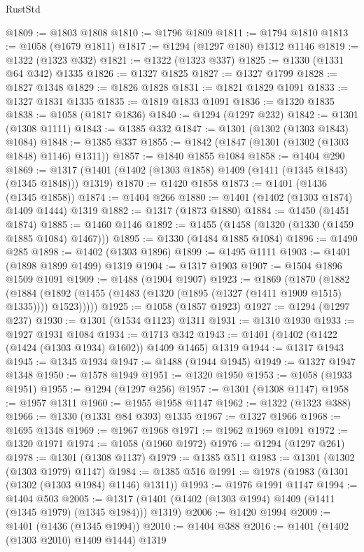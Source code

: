 \begin{lexlean}{RustStd}
\begin{coremodule}
@1809 := @1803 @1808
@1810 := @1796 @1809
@1811 := @1794 @1810
@1813 := @1058 (@1679 @1811)
@1817 := @1294 (@1297 @180) @1312 @1146
@1819 := @1322 (@1323 @332)
@1821 := @1322 (@1323 @337)
@1825 := @1330 (@1331 @64 @342) @1335
@1826 := @1327 @1825
@1827 := @1327 @1799
@1828 := @1827 @1348
@1829 := @1826 @1828
@1831 := @1821 @1829 @1091
@1833 := @1327 @1831 @1335
@1835 := @1819 @1833 @1091
@1836 := @1320 @1835
@1838 := @1058 (@1817 @1836)
@1840 := @1294 (@1297 @232)
@1842 := @1301 (@1308 @1111)
@1843 := @1385 @332
@1847 := @1301 (@1302 (@1303 @1843) @1084)
@1848 := @1385 @337
@1855 := @1842 (@1847 (@1301 (@1302 (@1303 @1848) @1146) @1311))
@1857 := @1840 @1855 @1084
@1858 := @1404 @290
@1869 := @1317 (@1401 (@1402 (@1303 @1858) @1409 (@1411 (@1345 @1843) (@1345 @1848))) @1319)
@1870 := @1420 @1858
@1873 := @1401 (@1436 (@1345 @1858))
@1874 := @1404 @266
@1880 := @1401 (@1402 (@1303 @1874) @1409 @1444) @1319
@1882 := @1317 (@1873 @1880)
@1884 := @1450 (@1451 @1874)
@1885 := @1460 @1146
@1892 := @1455 (@1458 (@1320 (@1330 (@1459 @1885 @1084) @1467)))
@1895 := @1330 (@1484 @1885 @1084)
@1896 := @1490 @285
@1898 := @1402 (@1303 @1896)
@1899 := @1495 @1111
@1903 := @1401 (@1898 @1899 @1499) @1319
@1904 := @1317 @1903
@1907 := @1504 @1896 @1509 @1091
@1909 := @1488 (@1904 @1907)
@1923 := @1869
    (@1870
      (@1882
        (@1884 (@1892 (@1455 (@1483 (@1320 (@1895 (@1327 (@1411 @1909 @1515) @1335)))) @1523)))))
@1925 := @1058 (@1857 @1923)
@1927 := @1294 (@1297 @237)
@1930 := @1301 (@1534 @1123) @1311
@1931 := @1310 @1930
@1933 := @1927 @1931 @1084
@1934 := @1713 @342
@1943 := @1401 (@1402 (@1422 (@1424 (@1303 @1934) @1602)) @1409 @1465) @1319
@1944 := @1317 @1943
@1945 := @1345 @1934
@1947 := @1488 (@1944 @1945)
@1949 := @1327 @1947 @1348
@1950 := @1578 @1949
@1951 := @1320 @1950
@1953 := @1058 (@1933 @1951)
@1955 := @1294 (@1297 @256)
@1957 := @1301 (@1308 @1147)
@1958 := @1957 @1311
@1960 := @1955 @1958 @1147
@1962 := @1322 (@1323 @388)
@1966 := @1330 (@1331 @84 @393) @1335
@1967 := @1327 @1966
@1968 := @1695 @1348
@1969 := @1967 @1968
@1971 := @1962 @1969 @1091
@1972 := @1320 @1971
@1974 := @1058 (@1960 @1972)
@1976 := @1294 (@1297 @261)
@1978 := @1301 (@1308 @1137)
@1979 := @1385 @511
@1983 := @1301 (@1302 (@1303 @1979) @1147)
@1984 := @1385 @516
@1991 := @1978 (@1983 (@1301 (@1302 (@1303 @1984) @1146) @1311))
@1993 := @1976 @1991 @1147
@1994 := @1404 @503
@2005 := @1317 (@1401 (@1402 (@1303 @1994) @1409 (@1411 (@1345 @1979) (@1345 @1984))) @1319)
@2006 := @1420 @1994
@2009 := @1401 (@1436 (@1345 @1994))
@2010 := @1404 @388
@2016 := @1401 (@1402 (@1303 @2010) @1409 @1444) @1319

\end{coremodule}
\end{lexlean}
